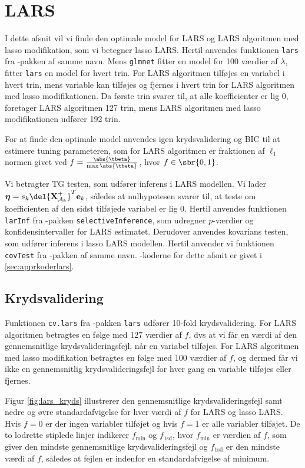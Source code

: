 \section{LARS}
I dette afsnit vil vi finde den optimale model for LARS og LARS algoritmen med lasso modifikation, som vi betegner lasso LARS. 
Hertil anvendes funktionen \texttt{lars} fra \Rlang-pakken af samme navn.
Mens \texttt{glmnet} fitter en model for 100 værdier af \(\lambda\), fitter \texttt{lars} en model for hvert trin.
For LARS algoritmen tilføjes en variabel i hvert trin, mens variable kan tilføjes og fjernes i hvert trin for LARS algoritmen med lasso modifikationen.
Da første trin svarer til, at alle koefficienter er lig 0, foretager LARS algoritmen 127 trin, mens LARS algoritmen med lasso modifikationen udfører 192 trin.

For at finde den optimale model anvendes igen krydsvalidering og BIC til at estimere tuning parameteren, som for LARS algoritmen er fraktionen af \(\ell_1\) normen givet ved \(f = \frac{\abs{\tbeta}}{\max \abs{\tbeta}}\), hvor \(f \in \sbr{0,1}\).

Vi betragter TG testen, som udfører inferens i LARS modellen.
Vi lader $\boldsymbol{\eta} = s_k \del{\textbf{X}^+_{\mathcal{A}_k}}^T \mathbf{e}_k$, således at nulhypotesen svarer til, at teste om koefficienten af den sidst tilføjede variabel er lig 0.
Hertil anvendes funktionen \texttt{larInf} fra \Rlang-pakken \texttt{selectiveInference}, som udregner \(p\)-værdier og konfidensintervaller for LARS estimatet.
Derudover anvendes kovarians testen, som udfører inferens i lasso LARS modellen.
Hertil anvender vi funktionen \texttt{covTest} fra \Rlang-pakken af samme navn. 
\Rlang-koderne for dette afsnit er givet i \ref{sec:apprkoderlars}.

\subsection{Krydsvalidering}
Funktionen \texttt{cv.lars} fra \Rlang-pakken \texttt{lars} udfører 10-fold krydsvalidering.
For LARS algoritmen betragtes en følge med 127 værdier af $f$, dvs at vi får en værdi af den gennemsnitlige krydsvalideringsfejl, når en variabel tilføjes.
For LARS algoritmen med lasso modifikation betragtes en følge med 100 værdier af $f$, og dermed får vi ikke en gennemsnitlig krydsvalideringsfejl for hver gang en variable tilføjes eller fjernes.

Figur \ref{fig:lars_kryds} illustrerer den gennemsnitlige krydsvalideringsfejl samt nedre og øvre standardafvigelse for hver værdi af $f$ for LARS og lasso LARS.
Hvis $f = 0$ er der ingen variabler tilføjet og hvis $f=1$ er alle variabler tilføjet. 
De to lodrette stiplede linjer indikerer \(f_{\text{min}}\) og \(f_\text{1sd}\), hvor \(f_{\text{min}}\) er værdien af \(f\), som giver den mindste gennemsnitlige krydsvalideringsfejl og \(f_\text{1sd}\) er den mindste værdi af \(f\), således at fejlen er indenfor en standardafvigelse af minimum. 

